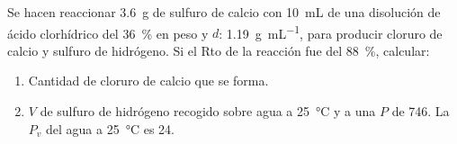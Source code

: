 Se hacen reaccionar \SI{3,6}{\gram} de sulfuro de calcio con \SI{10}{\milli\liter} de una disolución de ácido clorhídrico del \SI{36}{\percent} en peso y $d$: \SI{1,19}{\gram\per\milli\liter}, para producir cloruro de calcio y sulfuro de hidrógeno. Si el Rto de la reacción fue del \SI{88}{\percent}, calcular:
\begin{enumerate}[label={\alph*)},font={\color{red!50!black}\bfseries}]
	 \item Cantidad de cloruro de calcio que se forma.
 	\item $V$ de sulfuro de hidrógeno recogido sobre agua a \SI{25}{\celsius} y a una $P$ de \SI{746}{\torr}. La $P_v$ del agua a \SI{25}{\celsius} es \SI{24}{\torr}.
 \end{enumerate}
